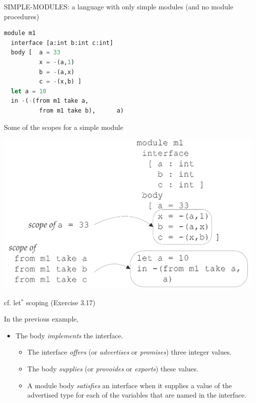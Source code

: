 \documentclass{article}
\begin{document}
\begin{huge}
SIMPLE-MODULES: a language with only simple modules (and no module procedures)

\begin{lstlisting}[language=Lisp]
module m1 
  interface [a:int b:int c:int]
  body [  a = 33
          x = -(a,1) 
          b = -(a,x)
          c = -(x,b) ]
  let a = 10
  in -(-(from m1 take a, 
          from m1 take b),      a)    
\end{lstlisting}


Some of the scopes for a simple module
\begin{center}
\includegraphics[width=0.85\linewidth]{eopl3_figure8_2}
\end{center}

cf. let$^*$ scoping (Exercise 3.17)


In the previous example,
\begin{itemize}
\item The body {\it implements} the interface.
\begin{itemize}
\item The interface {\it offers} (or {\it advertises} or {\it promises}) three integer values.
\item The body {\it supplies} (or {\it provoides} or {\it exports}) these values.
\item A module body {\it satisfies} an interface when it supplies a value of the advertised type for each of the variables that are named in the interface.
\end{itemize}
\end{itemize}



\end{huge}
\end{document}
